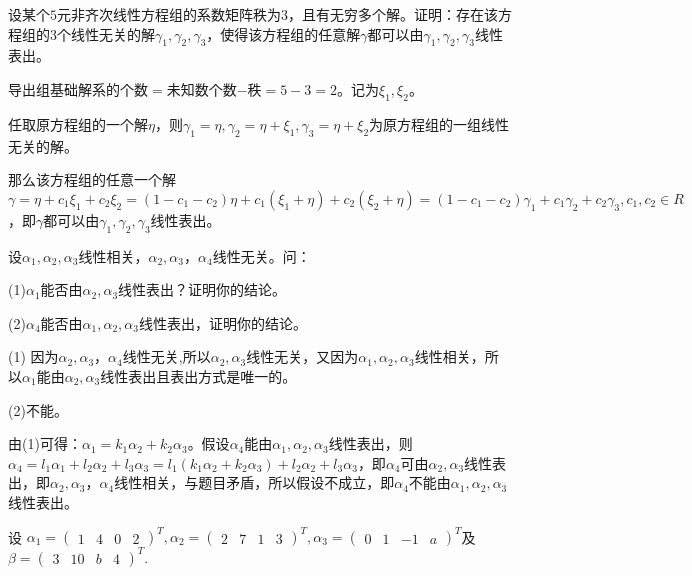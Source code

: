 \documentclass[a4paper]{report}
\begin{document}
\EX 设某个$5$元非齐次线性方程组的系数矩阵秩为3，且有无穷多个解。证明：存在该方程组的3个线性无关的解$\gamma_1,\gamma_2,\gamma_3$，使得该方程组的任意解$\gamma$都可以由$\gamma_1,\gamma_2,\gamma_3$线性表出。

\begin{zhengming}
导出组基础解系的个数$=$未知数个数$-$秩$=5-3=2$。记为$\xi_1,\xi_2$。

任取原方程组的一个解$\eta$，则$\gamma_1=\eta,\gamma_2=\eta+\xi_1,\gamma_3=\eta+\xi_2$为原方程组的一组线性无关的解。

那么该方程组的任意一个解$\gamma = \eta+c_1\xi_1+c_2\xi_2=(1-c_1-c_2)\eta+c_1(\xi_1+\eta)+c_2(\xi_2+\eta)=(1-c_1-c_2)\gamma_1+c_1\gamma_2+c_2\gamma_3,c_1,c_2\in R$，即$\gamma$都可以由$\gamma_1,\gamma_2,\gamma_3$线性表出。
\end{zhengming}

\EX 设$\alpha_1,\alpha_2,\alpha_3$线性相关，$\alpha_2,\alpha_3，\alpha_4$线性无关。问：

(1)$\alpha_1$能否由$\alpha_2,\alpha_3$线性表出？证明你的结论。

(2)$\alpha_4$能否由$\alpha_1,\alpha_2,\alpha_3$线性表出，证明你的结论。

\begin{zhengming}
(1)
因为$\alpha_2,\alpha_3，\alpha_4$线性无关,所以$\alpha_2,\alpha_3$线性无关，又因为$\alpha_1,\alpha_2,\alpha_3$线性相关，所以$\alpha_1$能由$\alpha_2,\alpha_3$线性表出且表出方式是唯一的。

(2)不能。

由(1)可得：$\alpha_1=k_1\alpha_2+k_2\alpha_3$。假设$\alpha_4$能由$\alpha_1,\alpha_2,\alpha_3$线性表出，则$\alpha_4=l_1\alpha_1+l_2\alpha_2+l_3\alpha_3=l_1(k_1\alpha_2+k_2\alpha_3)+l_2\alpha_2+l_3\alpha_3$，即$\alpha_4$可由$\alpha_2,\alpha_3$线性表出，即$\alpha_2,\alpha_3，\alpha_4$线性相关，与题目矛盾，所以假设不成立，即$\alpha_4$不能由$\alpha_1,\alpha_2,\alpha_3$线性表出。
\end{zhengming}

\EX 设
$\alpha_1=
\begin{pmatrix}
1&4&0&2
\end{pmatrix}^T,
\alpha_2=
\begin{pmatrix}
2&7&1&3
\end{pmatrix}^T,
\alpha_3=
\begin{pmatrix}
0&1&-1&a
\end{pmatrix}^T
$及
$
\beta=
\begin{pmatrix}
3&10&b&4
\end{pmatrix}^T
$.
\end{document}
